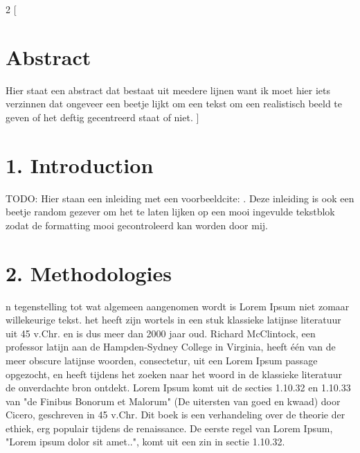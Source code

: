 \begin{multicols}{2}
[
\section*{\centering Abstract}
Hier staat een abstract dat bestaat uit meedere lijnen want ik moet hier iets verzinnen dat ongeveer een beetje lijkt om een tekst om een realistisch beeld te geven of het deftig gecentreerd staat of niet.
]

\section*{1. Introduction} %
TODO: Hier staan een inleiding met een voorbeeldcite: \cite{deepconn_eng_summary}. Deze inleiding is ook een beetje random gezever om het te laten lijken op een mooi ingevulde tekstblok zodat de formatting mooi gecontroleerd kan worden door mij.

\section*{2. Methodologies}
n tegenstelling tot wat algemeen aangenomen wordt is Lorem Ipsum niet zomaar willekeurige tekst. het heeft zijn wortels in een stuk klassieke latijnse literatuur uit 45 v.Chr. en is dus meer dan 2000 jaar oud. Richard McClintock, een professor latijn aan de Hampden-Sydney College in Virginia, heeft één van de meer obscure latijnse woorden, consectetur, uit een Lorem Ipsum passage opgezocht, en heeft tijdens het zoeken naar het woord in de klassieke literatuur de onverdachte bron ontdekt. Lorem Ipsum komt uit de secties 1.10.32 en 1.10.33 van "de Finibus Bonorum et Malorum" (De uitersten van goed en kwaad) door Cicero, geschreven in 45 v.Chr. Dit boek is een verhandeling over de theorie der ethiek, erg populair tijdens de renaissance. De eerste regel van Lorem Ipsum, "Lorem ipsum dolor sit amet..", komt uit een zin in sectie 1.10.32.


\end{multicols}
